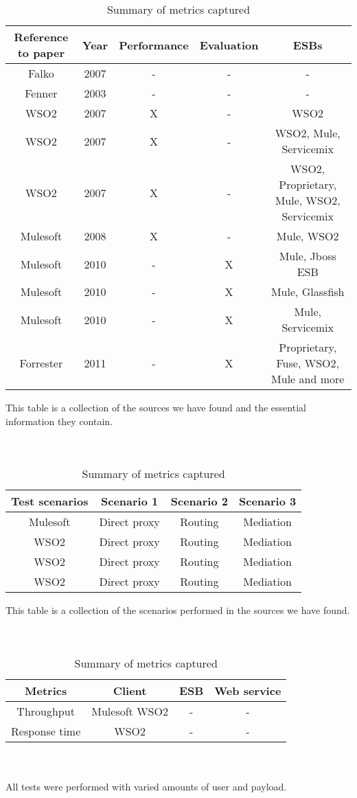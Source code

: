 \begin{table}[H]
	\caption{Summary of industrial papers and what tests they perform}
	\begin{tabular}{c c c c c}

		Reference to paper & Year & Performance & Evaluation & ESBs \\ 
		\hline	
		Falko \cite{falko07} & 2007 & - & - & - \\ 
		Fenner \cite{fenner03} & 2003 & - & - & - \\
		WSO2 \cite{Perera07} & 2007 & X & - & WSO2 \\
		WSO2 \cite{Perera07R2} & 2007 & X & - & WSO2, Mule, Servicemix\\
		WSO2 \cite{Perera07R3} & 2007 & X & - & WSO2, Proprietary, Mule, WSO2, Servicemix \\
		Mulesoft \cite{mulesoft08} & 2008 & X & - & Mule, WSO2\\
		Mulesoft \cite{mulevsjboss} & 2010 & - & X & Mule, Jboss ESB\\
		Mulesoft \cite{mulevsglassfish} & 2010 & - & X & Mule, Glassfish \\
		Mulesoft \cite{mulevsservicemix} & 2010 & - & X & Mule, Servicemix \\
		Forrester \cite{forrester11} & 2011 & - & X & Proprietary, Fuse, WSO2, Mule and more\\
		\hline
	\end{tabular}
	This table is a collection of the sources we have found and the essential information they contain.
	\\
	\\
	\\
	\caption{Summary of the scenarios in the industrial performance tests}
	\begin{tabular}{c c c c}
		\hline
		Test scenarios & Scenario 1 & Scenario 2 & Scenario 3 \\
		\hline
		Mulesoft \cite{mulesoft08} & Direct proxy & Routing & Mediation \\	
		WSO2 \cite{Perera07} & Direct proxy & Routing & Mediation \\
		WSO2 \cite{Perera07R2} & Direct proxy & Routing & Mediation \\
		WSO2 \cite{Perera07R3} & Direct proxy & Routing & Mediation \\
		\hline
	\end{tabular}
	This table is a collection of the scenarios performed in the sources we have found. 
	\\
	\\
	\\	
	\caption{Summary of metrics captured}
	\begin{tabular}{c c c c}
	Metrics &  Client & ESB & Web service \\
	\hline
	Throughput & Mulesoft \cite{mulesoft08} WSO2 \cite{Perera07R2,Perera07R3} & - & - \\
	Response time & WSO2 \cite{Perera07} & - & - \\
	\hline
	\end{tabular}
	\\
	\\
	All tests were performed with varied amounts of user and payload.
\end{table}

